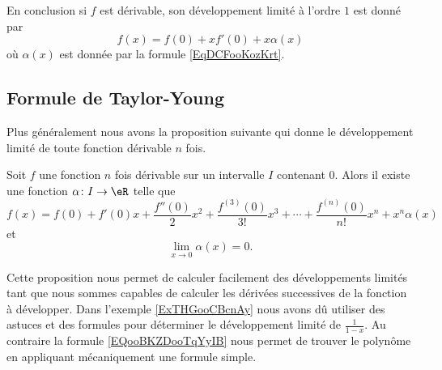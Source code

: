 En conclusion si \( f\) est dérivable, son développement limité à l'ordre \(  1\) est donné par
\begin{equation}
	f(x)=f(0)+xf'(0)+x\alpha(x)
\end{equation}
où \( \alpha(x)\) est donnée par la formule \eqref{EqDCFooKozKrt}.

\subsection{Formule de Taylor-Young}

Plus généralement nous avons la proposition suivante qui donne le développement limité de toute fonction dérivable \( n\) fois.

\begin{proposition}    \label{PropVDGooCexFwy}
	Soit \( f\) une fonction \( n\) fois dérivable sur un intervalle \( I\) contenant \( 0\). Alors il existe une fonction \( \alpha\colon I\to \eR\) telle que
	\begin{equation}        \label{EQooBKZDooTqYyIB}
		f(x)=f(0)+f'(0)x+\frac{ f''(0) }{ 2 }x^2+\frac{ f^{(3)}(0) }{ 3! }x^3+\cdots +\frac{ f^{(n)}(0) }{ n! }x^n+x^n\alpha(x)
	\end{equation}
	et
	\begin{equation}
		\lim_{x\to 0} \alpha(x)=0.
	\end{equation}
\end{proposition}

Cette proposition nous permet de calculer facilement des développements limités tant que nous sommes capables de calculer les dérivées successives de la fonction à développer. Dans l'exemple \ref{ExTHGooCBcnAy} nous avons dû utiliser des astuces et des formules pour déterminer le développement limité de \( \frac{1}{ 1-x }\). Au contraire la formule \eqref{EQooBKZDooTqYyIB} nous permet de trouver le polynôme en appliquant mécaniquement une formule simple.


